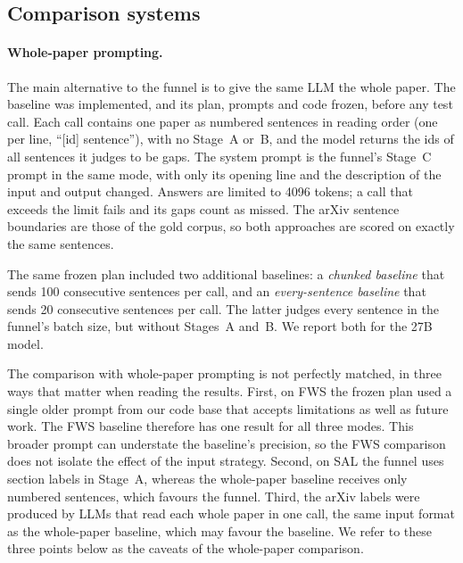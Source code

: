 \subsection{Comparison systems}
\label{sec:comparison}

\paragraph{Whole-paper prompting.} The main alternative to the funnel is to give the same LLM the whole paper. The baseline was implemented, and its plan, prompts and code frozen, before any test call. Each call contains one paper as numbered sentences in reading order (one per line, ``[id] sentence''), with no Stage~A or~B, and the model returns the ids of all sentences it judges to be gaps. The system prompt is the funnel's Stage~C prompt in the same mode, with only its opening line and the description of the input and output changed. Answers are limited to 4096 tokens; a call that exceeds the limit fails and its gaps count as missed. The arXiv sentence boundaries are those of the gold corpus, so both approaches are scored on exactly the same sentences.

The same frozen plan included two additional baselines: a \emph{chunked baseline} that sends 100 consecutive sentences per call, and an \emph{every-sentence baseline} that sends 20 consecutive sentences per call. The latter judges every sentence in the funnel's batch size, but without Stages~A and~B. We report both for the 27B model.

The comparison with whole-paper prompting is not perfectly matched, in three ways that matter when reading the results. First, on FWS the frozen plan used a single older prompt from our code base that accepts limitations as well as future work. The FWS baseline therefore has one result for all three modes. This broader prompt can understate the baseline's precision, so the FWS comparison does not isolate the effect of the input strategy. Second, on SAL the funnel uses section labels in Stage~A, whereas the whole-paper baseline receives only numbered sentences, which favours the funnel. Third, the arXiv labels were produced by LLMs that read each whole paper in one call, the same input format as the whole-paper baseline, which may favour the baseline. We refer to these three points below as the caveats of the whole-paper comparison.


